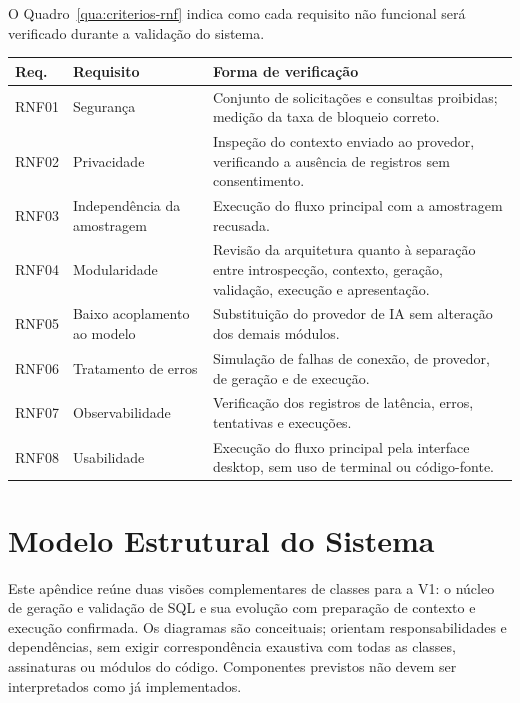 \begin{apendicesenv}
O Quadro~\ref{qua:criterios-rnf} indica como cada requisito não funcional será verificado durante a validação do sistema.

\begin{quadro}[htb]
    \caption{Critérios de verificação dos requisitos não funcionais}
    \label{qua:criterios-rnf}
    \begin{tabular}{|p{1.7cm}|p{4.0cm}|p{8.5cm}|}
        \hline
        \textbf{Req.} & \textbf{Requisito} & \textbf{Forma de verificação} \\ \hline
        RNF01 & Segurança & Conjunto de solicitações e consultas proibidas; medição da taxa de bloqueio correto. \\ \hline
        RNF02 & Privacidade & Inspeção do contexto enviado ao provedor, verificando a ausência de registros sem consentimento. \\ \hline
        RNF03 & Independência da amostragem & Execução do fluxo principal com a amostragem recusada. \\ \hline
        RNF04 & Modularidade & Revisão da arquitetura quanto à separação entre introspecção, contexto, geração, validação, execução e apresentação. \\ \hline
        RNF05 & Baixo acoplamento ao modelo & Substituição do provedor de IA sem alteração dos demais módulos. \\ \hline
        RNF06 & Tratamento de erros & Simulação de falhas de conexão, de provedor, de geração e de execução. \\ \hline
        RNF07 & Observabilidade & Verificação dos registros de latência, erros, tentativas e execuções. \\ \hline
        RNF08 & Usabilidade & Execução do fluxo principal pela interface desktop, sem uso de terminal ou código-fonte. \\ \hline
    \end{tabular}
\end{quadro}
	
	
	
	\chapter{Modelo Estrutural do Sistema}

  \label{ap:estrutural}

Este apêndice reúne duas visões complementares de classes para a V1: o núcleo de geração e validação de SQL e sua evolução com preparação de contexto e execução confirmada. Os diagramas são conceituais; orientam responsabilidades e dependências, sem exigir correspondência exaustiva com todas as classes, assinaturas ou módulos do código. Componentes previstos não devem ser interpretados como já implementados.


\end{apendicesenv}
